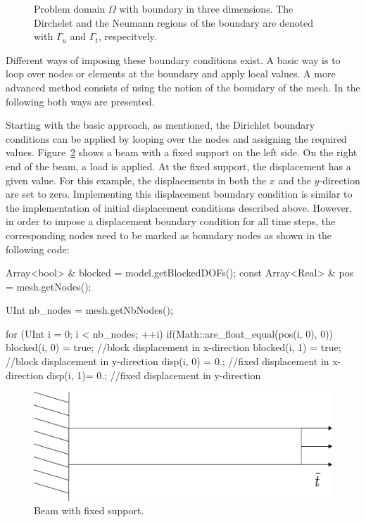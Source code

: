\begin{figure} \centering
\def\svgwidth{0.5\columnwidth}
  
  \caption{Problem domain $\Omega$ with boundary in three
    dimensions. The Dirchelet and the Neumann regions of the boundary
    are denoted with $\Gamma_u$ and $\Gamma_t$,
    respecitvely.\label{fig:smm:boundaries}}
  \label{fig:problemDomain}
\end{figure}

Different ways of imposing these boundary conditions exist. A basic
way is to loop over nodes or elements at the boundary and apply local
values. A more advanced method consists of using the notion of the
boundary of the mesh. In the following both ways are presented.

Starting with the basic approach, as mentioned, the Dirichlet boundary
conditions can be applied by looping over the nodes and assigning the
required values. Figure~\ref{fig:smm:dirichlet_bc} shows a beam with a
fixed support on the left side. On the right end of the beam, a load
is applied. At the fixed support, the displacement has a given
value. For this example, the displacements in both the $x$ and the
$y$-direction are set to zero. Implementing this displacement boundary
condition is similar to the implementation of initial displacement
conditions described above. However, in order to impose a displacement
boundary condition for all time steps, the corresponding nodes need to
be marked as boundary nodes as shown in the following code:

\begin{cpp}
Array<bool> & blocked = model.getBlockedDOFs();
const Array<Real> & pos = mesh.getNodes();

UInt nb_nodes = mesh.getNbNodes();

for (UInt i = 0; i < nb_nodes; ++i) {
  if(Math::are_float_equal(pos(i, 0), 0)) {
    blocked(i, 0) = true; //block displacement in x-direction
    blocked(i, 1) = true; //block displacement in y-direction
    disp(i, 0) = 0.; //fixed displacement in x-direction
    disp(i, 1)= 0.; //fixed displacement in y-direction
  }
}
\end{cpp}

\begin{figure}[!htb]
  \centering
  \includegraphics[scale=0.4]{figures/dirichlet}
  \caption{Beam with fixed support.\label{fig:smm:dirichlet_bc}}
\end{figure}

